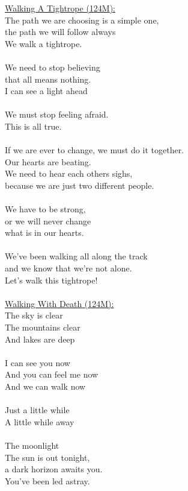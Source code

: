 \documentclass[11pt]{article}
\begin{document}
\underline{Walking A Tightrope (124M):}\\
The path we are choosing is a simple one,\\
the path we will follow always\\
We walk a tightrope.\\
\\
We need to stop believing\\
that all means nothing.\\
I can see a light ahead\\
\\
We must stop feeling afraid.\\
This is all true.\\
\\
If we are ever to change, we must do it together.\\
Our hearts are beating.\\
We need to hear each others sighs,\\
because we are just two different people.\\
\\
We have to be strong,\\
or we will never change\\
what is in our hearts.\\
\\
We've been walking all along the track\\
and we know that we're not alone.\\
Let's walk this tightrope!\\
\\
\underline{Walking With Death (124M):}\\
The sky is clear\\
The mountains clear\\
And lakes are deep\\
\\
I can see you now\\
And you can feel me now\\
And we can walk now\\
\\
Just a little while\\
A little while away\\
\\
The moonlight\\
The sun is out tonight,\\
a dark horizon awaits you.\\
You've been led astray.\\
\\
\end{document}
